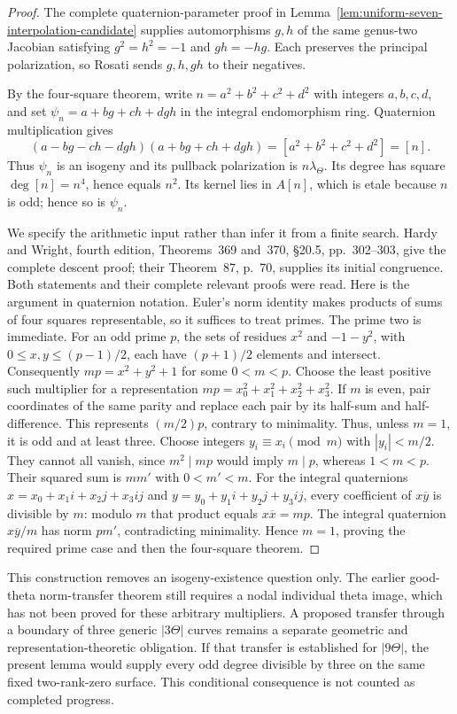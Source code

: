 \begin{proof}
The complete quaternion-parameter proof in
Lemma~\ref{lem:uniform-seven-interpolation-candidate} supplies
automorphisms $g,h$ of the same genus-two Jacobian satisfying
$g^2=h^2=-1$ and $gh=-hg$. Each preserves the principal
polarization, so Rosati sends $g,h,gh$ to their negatives.

By the four-square theorem, write
$n=a^2+b^2+c^2+d^2$ with integers $a,b,c,d$, and set
$\psi_n=a+bg+ch+dgh$ in the integral endomorphism ring.
Quaternion multiplication gives
\[
 (a-bg-ch-dgh)(a+bg+ch+dgh)
                =[a^2+b^2+c^2+d^2]=[n].
\]
Thus $\psi_n$ is an isogeny and its pullback polarization
is $n\lambda_\Theta$. Its degree has square
$\deg[n]=n^4$, hence equals $n^2$. Its kernel lies in
$A[n]$, which is etale because $n$ is odd; hence so is
$\psi_n$.

We specify the arithmetic input rather than infer it from a
finite search. Hardy and Wright, fourth edition, Theorems~369
and~370, \S20.5, pp.~302--303, give the complete descent
proof; their Theorem~87, p.~70, supplies its initial congruence.
Both statements and their complete relevant proofs were read.
Here is the argument in quaternion notation. Euler's norm identity
makes products of sums of four squares representable, so it suffices
to treat primes. The prime two is immediate. For an odd prime $p$,
the sets of residues $x^2$ and $-1-y^2$, with
$0\le x,y\le(p-1)/2$, each have $(p+1)/2$ elements and intersect.
Consequently $mp=x^2+y^2+1$ for some $0<m<p$.
Choose the least positive such multiplier for a representation
$mp=x_0^2+x_1^2+x_2^2+x_3^2$.
If $m$ is even, pair coordinates of the same parity and replace
each pair by its half-sum and half-difference. This represents
$(m/2)p$, contrary to minimality. Thus, unless $m=1$, it is
odd and at least three.
Choose integers $y_i\equiv x_i\pmod m$ with $|y_i|<m/2$.
They cannot all vanish, since $m^2\mid mp$ would imply
$m\mid p$, whereas $1<m<p$. Their squared sum is $m m'$
with $0<m'<m$. For the integral quaternions
$x=x_0+x_1i+x_2j+x_3ij$ and $y=y_0+y_1i+y_2j+y_3ij$,
every coefficient of $x\overline y$ is divisible by $m$:
modulo $m$ that product equals $x\overline x=mp$.
The integral quaternion $x\overline y/m$ has norm $pm'$,
contradicting minimality. Hence $m=1$, proving the required
prime case and then the four-square theorem.
\end{proof}

\begin{remark}
\label{rem:root-f0-all-odd-polarized-norms-scope-candidate}
This construction removes an isogeny-existence question only.
The earlier good-theta norm-transfer theorem still requires
a nodal individual theta image, which has not been proved for
these arbitrary multipliers. A proposed transfer through a
boundary of three generic $|3\Theta|$ curves remains a separate
geometric and representation-theoretic obligation. If that
transfer is established for $|9\Theta|$, the present lemma
would supply every odd degree divisible by three on the same
fixed two-rank-zero surface. This conditional consequence is
not counted as completed progress.
\end{remark}
